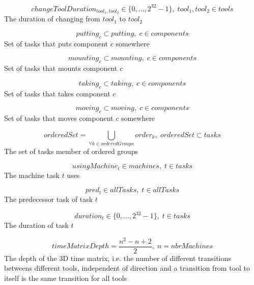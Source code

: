 \documentclass[10pt,a4paper]{report}
\begin{document}
\begin{equation}\label{eq:34}
changeToolDuration_{tool_1,tool_2} \in \{0 , \ldots , 2^{32}-1\}, \; tool_1,tool_2 \in tools
\end{equation} 
The duration of changing from $tool_1$ to $tool_2$

\begin{equation}\label{eq:35}
putting_c \subset putting, \; c \in components\end{equation}
Set of tasks that puts component $c$ somewhere

\begin{equation}\label{eq:36}
mounting_c \subset mounting, \; c \in components\end{equation}
Set of tasks that mounts component $c$

\begin{equation}\label{eq:37}
taking_c \subset taking, \; c \in components\end{equation}
Set of tasks that takes component $c$

\begin{equation}\label{eq:38}
moving_c \subset moving, \; c \in components\end{equation}
Set of tasks that moves component $c$ somewhere

\begin{equation}\label{eq:39}
orderedSet = \bigcup_{\forall k \in orderedGroups}order_k, \; orderedSet \subset tasks\end{equation}
The set of tasks member of ordered groups

\begin{equation}\label{eq:40}
usingMachine_t \in machines, \; t \in tasks\end{equation}
The machine task $t$ uses

\begin{equation}\label{eq:41}
pred_t \in allTasks, \; t \in allTasks\end{equation}
The predecessor task of task $t$

\begin{equation}\label{eq:42}
duration_t \in \{0 , \ldots , 2^{32}-1\}, \; t \in tasks\end{equation}
The duration of task $t$

\begin{equation}\label{eq:43}
timeMatrixDepth = \frac{n^2 - n + 2}{2}, \; n = nbrMachines\end{equation}
The depth of the 3D time matrix, i.e. the number of different transitions betweens different tools, independent of direction and a transition from tool to itself is the same transition for all tools
\end{document}
